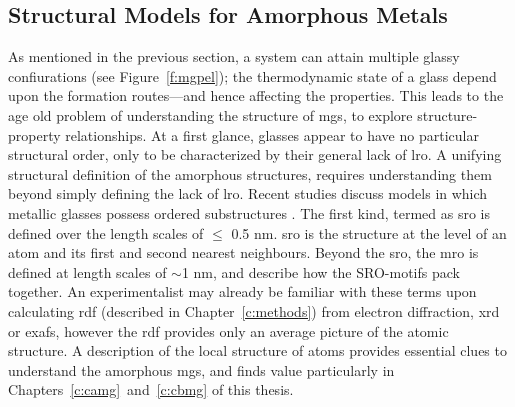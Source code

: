 
\subsection{Structural Models for Amorphous Metals}\label{s:sro-mgs}
As mentioned in the previous section, a system can attain multiple glassy confiurations (see Figure~\ref{f:mgpel}); the thermodynamic state of a glass depend upon the formation routes---and hence affecting the properties. This leads to the age old problem of understanding the structure of \gls{mg}s, to explore structure-property relationships. At a first glance, glasses appear to have no particular structural order, only to be characterized by their general lack of \gls{lro}. A unifying structural definition of the amorphous structures, requires understanding them beyond simply defining the lack of \gls{lro}. Recent studies discuss models in which metallic glasses possess ordered substructures \cite{Sheng2006,Fukunaga2006,Greer2007}. The first kind, termed as \gls{sro} is defined over the length scales of $\leq$ 0.5 nm. \gls{sro} is the structure at the level of an atom and its first and second nearest neighbours. Beyond the \gls{sro}, the \gls{mro} is defined at length scales of $\sim$1 nm, and describe how the SRO-motifs pack together. An experimentalist may already be familiar with these terms upon calculating \gls{rdf} (described in Chapter~\ref{c:methods}) from electron diffraction, \gls{xrd} or \gls{exafs}, however the \gls{rdf} provides only an average picture of the atomic structure. A description of the local structure of atoms provides essential clues to understand the amorphous \gls{mg}s, and finds value particularly in Chapters~\ref{c:camg}~and~\ref{c:cbmg} of this thesis.  \par

